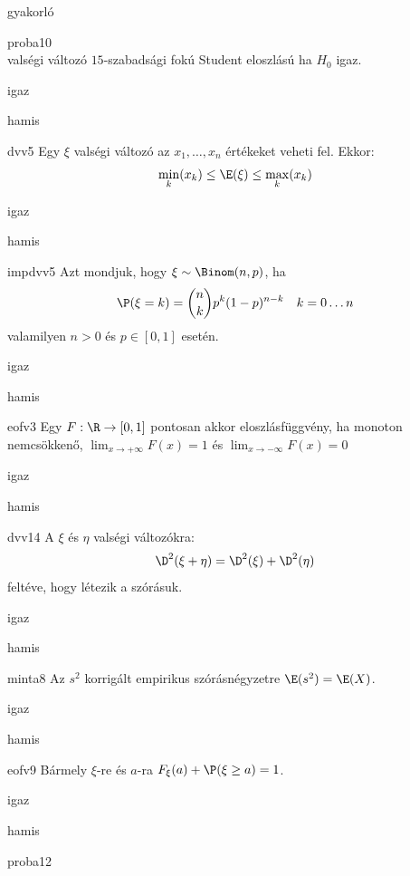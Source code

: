 \documentclass[12pt]{article}
\begin{document}
\begin{quiz}{gyakorló}
\begin{multi}[feedback={A feltételek mellett a fenti mennyiség sztenderd normális, ha $H_0$ igaz.}]{proba10}
$$$$
valségi változó $15$-szabadsági fokú Student eloszlású ha $H_0$ igaz.
\item igaz
\item* hamis
\end{multi}
\begin{multi}[feedback={Az adott feltételek mellet a várható érték egy súlyozott közép.}]{dvv5}
Egy $\xi$ valségi változó az $x_1,\ldots, x_n$ értékeket veheti fel. Ekkor:
$$
\min_k(x_k)\le \E(\xi) \le \max_k(x_k)
$$
\item* igaz
\item hamis
\end{multi}
\begin{multi}[feedback={Def.}]{impdvv5}
Azt mondjuk, hogy $\xi\sim \Binom(n,p)$, ha 
$$
\P(\xi=k)=\binom{n}{k}p^k(1-p)^{n-k}\ \ \ k=0\ldots n
$$
valamilyen $n>0$ és $p\in[0,1]$ esetén.
\item* igaz
\item hamis
\end{multi}
\begin{multi}[feedback={A balról folytonosság kell.}]{eofv3}
Egy $F:\R\to [0,1]$ pontosan akkor eloszlásfüggvény, ha monoton nemcsökkenő, 
$\lim_{x\to+\infty}F(x)=1$ és $\lim_{x\to-\infty}F(x)=0$
\item igaz
\item* hamis
\end{multi}
\begin{multi}[feedback={Páronként független valségi változókra a szórásnégyzet additív, általában nem.}]{dvv14}
A $\xi$ és $\eta$ valségi változókra:
$$
\D^2(\xi+\eta)=\D^2(\xi)+\D^2(\eta)
$$
feltéve, hogy létezik a szórásuk.
\item igaz
\item* hamis
\end{multi}
\begin{multi}[feedback={Az $s^2$ torzítatlan becslése a sokasági (elméleti) szórásnégyzetnek}]{minta8}
Az $s^2$ korrigált empirikus szórásnégyzetre $\E(s^2)=\E(X)$.
\item igaz
\item* hamis
\end{multi}
\begin{multi}[feedback={Komplementer események.}]{eofv9}
Bármely $\xi$-re és $a$-ra $F_{\xi}(a)+\P(\xi\ge a)=1$.
\item* igaz
\item hamis
\end{multi}
\begin{multi}[feedback={A feltételek mellett a fenti Student (t) eloszlású.}]{proba12}

\end{multi}
\end{quiz}
\end{document}
